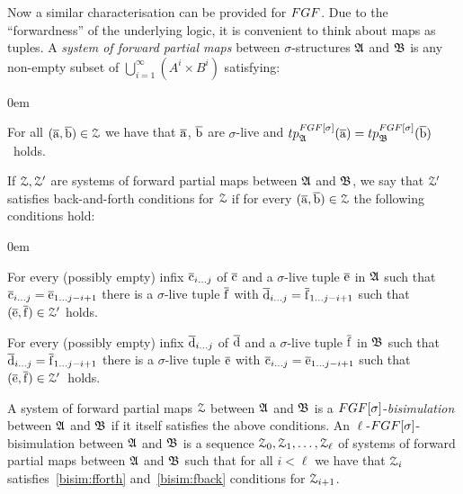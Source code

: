 Now a similar characterisation can be provided for $\FGF$. 
Due to the ``forwardness'' of the underlying logic, it is convenient to think about maps as tuples.
A \emph{system of forward partial maps} between $\sigma$-structures ${\mathfrak{A}}$ and ${\mathfrak{B}}$ is any non-empty subset of $\bigcup_{i=1}^{\infty} (A^i \times B^i)$ satisfying:
\begin{description}\itemsep0em
  \item[\desclabel{(AtomicEq)}{bisim:atomiceq}] For all $(\overline{\mathrm{a}}, \overline{\mathrm{b}}) \in \mathcal{Z}$ we have that $\overline{\mathrm{a}}$, $\overline{\mathrm{b}}$ are $\sigma$-live and $\tp{\FGF[\sigma]}{\str{A}}{\elemtuplea} = \tp{\FGF[\sigma]}{\str{B}}{\elemtupleb}$~holds.
\end{description}
If $\mathcal{Z}, \mathcal{Z}'$ are systems of forward partial maps between ${\mathfrak{A}}$ and ${\mathfrak{B}}$, we say that $\mathcal{Z}'$ satisfies back-and-forth conditions for $\mathcal{Z}$ if for every $(\overline{\mathrm{a}}, \overline{\mathrm{b}}) \in \mathcal{Z}$ the following conditions hold:
\begin{description}\itemsep0em
  \item[\desclabel{(fForth)}{bisim:fforth}] For every (possibly empty) infix $\overline{\mathrm{c}}_{i\ldots j}$ of $\overline{\mathrm{c}}$ and a $\sigma$-live tuple $\overline{\mathrm{e}}$ in ${\mathfrak{A}}$ such that $\overline{\mathrm{c}}_{i\ldots j} = \overline{\mathrm{e}}_{1\ldots j{-}i{+}1}$ there is a $\sigma$-live tuple $\overline{\mathrm{f}}$ with $\overline{\mathrm{d}}_{i\ldots j} = {\overline{\mathrm{f}}}_{1\dots j{-}i{+}1}$ such that $(\overline{\mathrm{e}}, \overline{\mathrm{f}}) \in \mathcal{Z}'$ holds.
  \item[\desclabel{(fBack)}{bisim:fback}] For every (possibly empty) infix $\overline{\mathrm{d}}_{i\ldots j}$ of $\overline{\mathrm{d}}$ and a $\sigma$-live tuple $\overline{\mathrm{f}}$ in ${\mathfrak{B}}$ such that $\overline{\mathrm{d}}_{i\ldots j} = {\overline{\mathrm{f}}}_{1\dots j{-}i{+}1}$ there is a $\sigma$-live tuple $\overline{\mathrm{e}}$ with $\overline{\mathrm{c}}_{i\ldots j} = \overline{\mathrm{e}}_{1\ldots j{-}i{+}1}$ such that $(\overline{\mathrm{e}}, \overline{\mathrm{f}}) \in \mathcal{Z}'$~holds.
\end{description}
A system of forward partial maps $\mathcal{Z}$ between ${\mathfrak{A}}$ and ${\mathfrak{B}}$ is a $\FGF[\sigma]$-\emph{bisimulation} between ${\mathfrak{A}}$ and ${\mathfrak{B}}$ if it itself satisfies the above conditions.
An $\ell$-$\FGF[\sigma]$-bisimulation between ${\mathfrak{A}}$ and ${\mathfrak{B}}$ is a sequence $\mathcal{Z}_0, \mathcal{Z}_1, \ldots, \mathcal{Z}_\ell$ of systems of forward partial maps between ${\mathfrak{A}}$ and ${\mathfrak{B}}$ such that for all $i < \ell$ we have that $\mathcal{Z}_i$ satisfies~\ref{bisim:fforth} and~\ref{bisim:fback} conditions for $\mathcal{Z}_{i{+}1}$.
